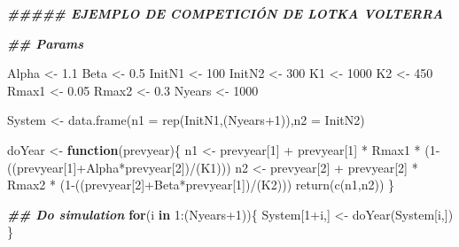 \documentclass[
]{article}
\newenvironment{Shaded}{\begin{snugshade}}{\end{snugshade}}
\newcommand{\AttributeTok}[1]{\textcolor[rgb]{0.77,0.63,0.00}{#1}}
\newcommand{\ControlFlowTok}[1]{\textcolor[rgb]{0.13,0.29,0.53}{\textbf{#1}}}
\newcommand{\DecValTok}[1]{\textcolor[rgb]{0.00,0.00,0.81}{#1}}
\newcommand{\DocumentationTok}[1]{\textcolor[rgb]{0.56,0.35,0.01}{\textbf{\textit{#1}}}}
\newcommand{\FloatTok}[1]{\textcolor[rgb]{0.00,0.00,0.81}{#1}}
\newcommand{\FunctionTok}[1]{\textcolor[rgb]{0.00,0.00,0.00}{#1}}
\newcommand{\NormalTok}[1]{#1}
\newcommand{\OtherTok}[1]{\textcolor[rgb]{0.56,0.35,0.01}{#1}}
\newcommand{\SpecialCharTok}[1]{\textcolor[rgb]{0.00,0.00,0.00}{#1}}
\begin{document}
\begin{Shaded}
\begin{Highlighting}[]
\DocumentationTok{\#\#\#\#\# EJEMPLO DE COMPETICIÓN DE LOTKA VOLTERRA}

\DocumentationTok{\#\# Params}

\NormalTok{Alpha }\OtherTok{\textless{}{-}} \FloatTok{1.1}
\NormalTok{Beta }\OtherTok{\textless{}{-}} \FloatTok{0.5}
\NormalTok{InitN1 }\OtherTok{\textless{}{-}} \DecValTok{100}
\NormalTok{InitN2 }\OtherTok{\textless{}{-}} \DecValTok{300}
\NormalTok{K1 }\OtherTok{\textless{}{-}} \DecValTok{1000}
\NormalTok{K2 }\OtherTok{\textless{}{-}} \DecValTok{450}
\NormalTok{Rmax1 }\OtherTok{\textless{}{-}} \FloatTok{0.05}
\NormalTok{Rmax2 }\OtherTok{\textless{}{-}} \FloatTok{0.3}
\NormalTok{Nyears }\OtherTok{\textless{}{-}} \DecValTok{1000}

\NormalTok{System }\OtherTok{\textless{}{-}} \FunctionTok{data.frame}\NormalTok{(}\AttributeTok{n1 =} \FunctionTok{rep}\NormalTok{(InitN1,(Nyears}\SpecialCharTok{+}\DecValTok{1}\NormalTok{)),}\AttributeTok{n2 =}\NormalTok{ InitN2)}

\NormalTok{doYear }\OtherTok{\textless{}{-}} \ControlFlowTok{function}\NormalTok{(prevyear)\{}
\NormalTok{  n1 }\OtherTok{\textless{}{-}}\NormalTok{ prevyear[}\DecValTok{1}\NormalTok{] }\SpecialCharTok{+}\NormalTok{ prevyear[}\DecValTok{1}\NormalTok{] }\SpecialCharTok{*}\NormalTok{ Rmax1 }\SpecialCharTok{*}\NormalTok{ (}\DecValTok{1}\SpecialCharTok{{-}}\NormalTok{((prevyear[}\DecValTok{1}\NormalTok{]}\SpecialCharTok{+}\NormalTok{Alpha}\SpecialCharTok{*}\NormalTok{prevyear[}\DecValTok{2}\NormalTok{])}\SpecialCharTok{/}\NormalTok{(K1)))}
\NormalTok{  n2 }\OtherTok{\textless{}{-}}\NormalTok{ prevyear[}\DecValTok{2}\NormalTok{] }\SpecialCharTok{+}\NormalTok{ prevyear[}\DecValTok{2}\NormalTok{] }\SpecialCharTok{*}\NormalTok{ Rmax2 }\SpecialCharTok{*}\NormalTok{ (}\DecValTok{1}\SpecialCharTok{{-}}\NormalTok{((prevyear[}\DecValTok{2}\NormalTok{]}\SpecialCharTok{+}\NormalTok{Beta}\SpecialCharTok{*}\NormalTok{prevyear[}\DecValTok{1}\NormalTok{])}\SpecialCharTok{/}\NormalTok{(K2)))}
  \FunctionTok{return}\NormalTok{(}\FunctionTok{c}\NormalTok{(n1,n2))}
\NormalTok{\}}

\DocumentationTok{\#\# Do simulation}
\ControlFlowTok{for}\NormalTok{(i }\ControlFlowTok{in} \DecValTok{1}\SpecialCharTok{:}\NormalTok{(Nyears}\SpecialCharTok{+}\DecValTok{1}\NormalTok{))\{}
\NormalTok{  System[}\DecValTok{1}\SpecialCharTok{+}\NormalTok{i,] }\OtherTok{\textless{}{-}} \FunctionTok{doYear}\NormalTok{(System[i,])}
\NormalTok{\}}
\end{Highlighting}
\end{Shaded}
\end{document}
